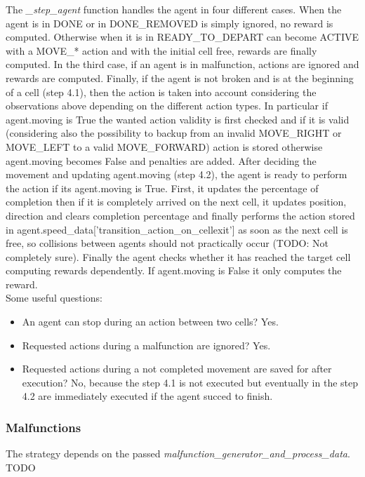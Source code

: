 \documentclass[12pt, a4paper, hidelinks]{article}
\begin{document}
The \textit{\_step\_agent} function handles the agent in four different cases.
When the agent is in DONE or in DONE\_REMOVED is simply ignored, no reward is computed.
Otherwise when it is in READY\_TO\_DEPART can become ACTIVE with a MOVE\_* action and with the initial cell free, rewards are finally computed.
In the third case, if an agent is in malfunction, actions are ignored and rewards are computed.
Finally, if the agent is not broken and is at the beginning of a cell (step 4.1), then the action is taken into account considering the observations above depending on the different action types.
In particular if agent.moving is True the wanted action validity is first checked and if it is valid (considering also the possibility to backup from an invalid MOVE\_RIGHT or MOVE\_LEFT to a valid MOVE\_FORWARD) action is stored otherwise agent.moving becomes False and penalties are added.
After deciding the movement and updating agent.moving (step 4.2), the agent is ready to perform the action if its agent.moving is True.
First, it updates the percentage of completion then if it is completely arrived on the next cell, it updates position, direction and clears completion percentage and finally performs the action stored in agent.speed\_data['transition\_action\_on\_cellexit'] as soon as the next cell is free, so collisions between agents should not practically occur (TODO: Not completely sure).
Finally the agent checks whether it has reached the target cell computing rewards dependently.
If agent.moving is False it only computes the reward.\\

Some useful questions:
\begin{itemize}
	\item An agent can stop during an action between two cells? Yes.
	\item Requested actions during a malfunction are ignored? Yes.
	\item Requested actions during a not completed movement are saved for after execution? No, because the step 4.1 is not executed but eventually in the step 4.2 are immediately executed if the agent succed to finish.
\end{itemize}


\subsubsection*{Malfunctions}
The strategy depends on the passed \textit{malfunction\_generator\_and\_process\_data}.
TODO
\end{document}
